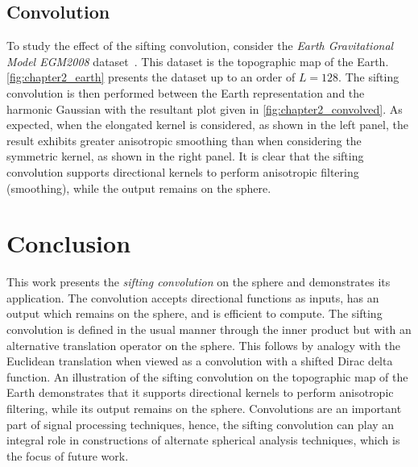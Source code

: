 

\subsection{Convolution}\label{sec:chapter2_convolution}

To study the effect of the sifting convolution, consider the \emph{Earth Gravitational Model EGM2008} dataset~\cite{Pavlis2013}.
This dataset is the topographic map of the Earth.
\cref{fig:chapter2_earth} presents the dataset up to an order of \(L=128\).
The sifting convolution is then performed between the Earth representation and the harmonic Gaussian with the resultant plot given in \cref{fig:chapter2_convolved}.
As expected, when the elongated kernel is considered, as shown in the left panel, the result exhibits greater anisotropic smoothing than when considering the symmetric kernel, as shown in the right panel.
It is clear that the sifting convolution supports directional kernels to perform anisotropic filtering (smoothing), while the output remains on the sphere.





\section{Conclusion}\label{sec:chapter2_conclusion}

This work presents the \emph{sifting convolution} on the sphere and demonstrates its application.
The convolution accepts directional functions as inputs, has an output which remains on the sphere, and is efficient to compute.
The sifting convolution is defined in the usual manner through the inner product but with an alternative translation operator on the sphere.
This follows by analogy with the Euclidean translation when viewed as a convolution with a shifted Dirac delta function.
An illustration of the sifting convolution on the topographic map of the Earth demonstrates that it supports directional kernels to perform anisotropic filtering, while its output remains on the sphere.
Convolutions are an important part of signal processing techniques, hence, the sifting convolution can play an integral role in constructions of alternate spherical analysis techniques, which is the focus of future work.
